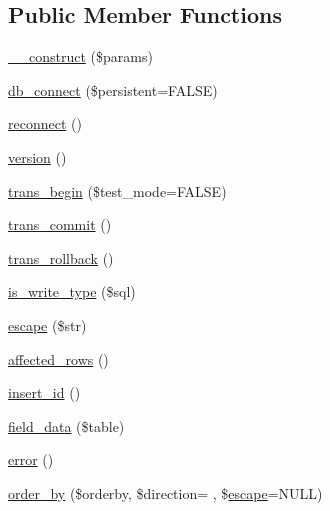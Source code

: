 \subsection*{Public Member Functions}
\begin{DoxyCompactItemize}
\item 
\hyperlink{class_c_i___d_b__postgre__driver_a9162320adff1a1a4afd7f2372f753a3e}{\+\_\+\+\_\+construct} (\$params)
\item 
\hyperlink{class_c_i___d_b__postgre__driver_a52bf595e79e96cc0a7c907a9b45aeb4d}{db\+\_\+connect} (\$persistent=F\+A\+L\+S\+E)
\item 
\hyperlink{class_c_i___d_b__postgre__driver_a57c19c642ab3023e28d10c50f86ff0a8}{reconnect} ()
\item 
\hyperlink{class_c_i___d_b__postgre__driver_a6080dae0886626b9a4cedb29240708b1}{version} ()
\item 
\hyperlink{class_c_i___d_b__postgre__driver_a90e153cf190d273336d77cce930587e1}{trans\+\_\+begin} (\$test\+\_\+mode=F\+A\+L\+S\+E)
\item 
\hyperlink{class_c_i___d_b__postgre__driver_af4fbdcdace4aa94a139b64877601fe9b}{trans\+\_\+commit} ()
\item 
\hyperlink{class_c_i___d_b__postgre__driver_a53f76d4dfcd6ac04fb653982442aeef8}{trans\+\_\+rollback} ()
\item 
\hyperlink{class_c_i___d_b__postgre__driver_af435df5703c238769d6d16fde6d51182}{is\+\_\+write\+\_\+type} (\$sql)
\item 
\hyperlink{class_c_i___d_b__postgre__driver_ac8f37ca5703d4558c732e692194f8cd6}{escape} (\$str)
\item 
\hyperlink{class_c_i___d_b__postgre__driver_a77248aaad33eb132c04cc4aa3f4bc8cb}{affected\+\_\+rows} ()
\item 
\hyperlink{class_c_i___d_b__postgre__driver_a933f2cde8dc7f87875e257d0a4902e99}{insert\+\_\+id} ()
\item 
\hyperlink{class_c_i___d_b__postgre__driver_a90355121e1ed009e0efdbd544ab56efa}{field\+\_\+data} (\$table)
\item 
\hyperlink{class_c_i___d_b__postgre__driver_a43b8d30b879d4f09ceb059b02af2bc02}{error} ()
\item 
\hyperlink{class_c_i___d_b__postgre__driver_af4bc938040ad30a93e4880f61568c72e}{order\+\_\+by} (\$orderby, \$direction= \textquotesingle{}\textquotesingle{}, \$\hyperlink{class_c_i___d_b__postgre__driver_ac8f37ca5703d4558c732e692194f8cd6}{escape}=N\+U\+L\+L)
\end{DoxyCompactItemize}
